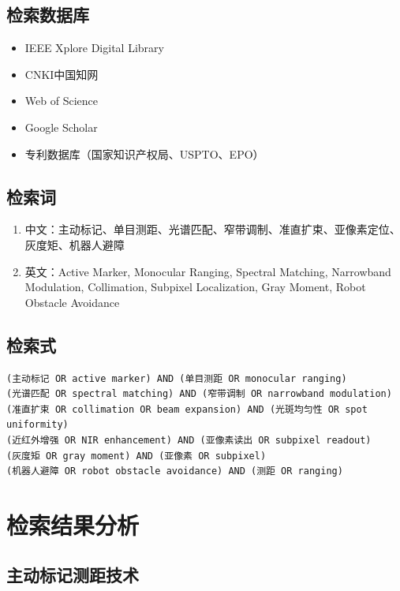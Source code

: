 \documentclass[12pt, a4paper]{ctexart}
\begin{document}
\subsection{检索数据库}

\begin{itemize}
\item IEEE Xplore Digital Library
\item CNKI中国知网
\item Web of Science
\item Google Scholar
\item 专利数据库（国家知识产权局、USPTO、EPO）
\end{itemize}

\subsection{检索词}

\begin{enumerate}
\item 中文：主动标记、单目测距、光谱匹配、窄带调制、准直扩束、亚像素定位、灰度矩、机器人避障
\item 英文：Active Marker, Monocular Ranging, Spectral Matching, Narrowband Modulation, Collimation, Subpixel Localization, Gray Moment, Robot Obstacle Avoidance
\end{enumerate}

\subsection{检索式}

\begin{verbatim}
(主动标记 OR active marker) AND (单目测距 OR monocular ranging)
(光谱匹配 OR spectral matching) AND (窄带调制 OR narrowband modulation)
(准直扩束 OR collimation OR beam expansion) AND (光斑均匀性 OR spot uniformity)
(近红外增强 OR NIR enhancement) AND (亚像素读出 OR subpixel readout)
(灰度矩 OR gray moment) AND (亚像素 OR subpixel)
(机器人避障 OR robot obstacle avoidance) AND (测距 OR ranging)
\end{verbatim}

\section{检索结果分析}

\subsection{主动标记测距技术}
\end{document}
